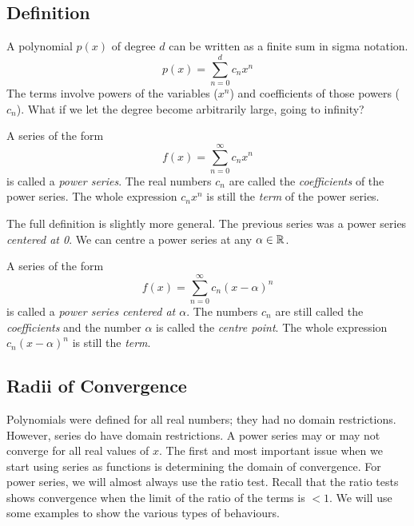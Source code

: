\documentclass[fleqn,letterpaper]{report}
\begin{document}
\subsection{Definition}
\label{power-series-definition}

A polynomial $p(x)$ of degree $d$ can be written as a finite
sum in sigma notation. 
\begin{equation*}
p(x) = \sum_{n=0}^d c_n x^n
\end{equation*}
The terms involve powers of the variables ($x^n$) and
coefficients of those powers ($c_n$). What if we let the
degree become arbitrarily large, going to infinity? 

\begin{defn}
A series of the form
\begin{equation*}
f(x) = \sum_{n=0}^\infty c_n x^n
\end{equation*}
is called a \emph{power series}. The real numbers $c_n$ are
called the \emph{coefficients} of the power series. The whole
expression $c_nx^n$ is still the \emph{term} of the power
series.
\end{defn}

The full definition is slightly more general. The previous
series was a power series \emph{centered at 0}. We can centre
a power series at any $\alpha \in \mathbb{R}$. 

\begin{defn} 
A series of the form
\begin{equation*}
f(x) = \sum_{n=0}^\infty c_n (x-\alpha)^n
\end{equation*}
is called a \emph{power series centered at $\alpha$}. The
numbers $c_n$ are still called the \emph{coefficients} and the
number $\alpha$ is called the \emph{centre point}. The whole
expression $c_n(x-\alpha)^n$ is still the \emph{term}.
\end{defn}

\subsection{Radii of Convergence}
\label{radii-of-convergence}

Polynomials were defined for all real numbers; they had no
domain restrictions. However, series do have domain
restrictions. A power series may or may not converge for all
real values of $x$. The first and most important issue
when we start using series as functions is determining the domain of
convergence. For power series, we will almost always use the
ratio test. Recall that the ratio tests shows convergence when
the limit of the ratio of the terms is $<1$. We will use some
examples to show the various types of behaviours.
\end{document}
